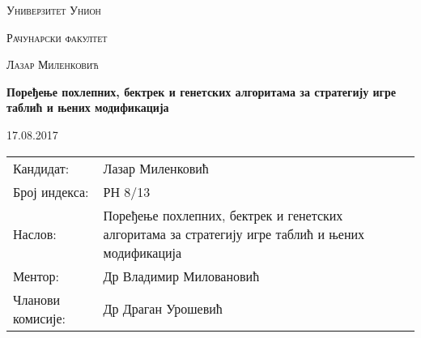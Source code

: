 \documentclass[a4paper, 12pt, ngerman]{article}
\newcommand{\DocumentTitle}{Поређење похлепних, бектрек и генетских алгоритама за стратегију игре таблић и њених модификација}
\begin{document}
\renewcommand{\contentsname}{Садржај}
\renewcommand{\refname}{Литература}
\renewcommand{\abstractname}{Апстракт}
\renewcommand{\figurename}{Слика}
\renewcommand{\appendixtocname}{Додаци}
\renewcommand{\lstlistingname}{Датотека}
\renewcommand{\tablename}{Табела}
\renewcommand{\proofname}{Доказ}

\makeatletter
\renewcommand{\ALG@name}{Алгоритам}
\makeatother

\begin{titlepage}
	\centering
	{\scshape\Large Универзитет Унион \par}
	\vspace{1cm}
	{\scshape\LARGE Рачунарски факултет\par}
	\vspace{2cm}
	{\scshape\large Лазар Миленковић\par}
	\vspace{0.5cm}
	{\huge\bfseries \DocumentTitle \par}
	\vspace{2cm}
	\vfill

	
	{\large 17.08.2017\par}
\end{titlepage}
\pagebreak


\begin{tabularx}{\textwidth}{lX}
	Кандидат: & Лазар Миленковић  \\
	Број индекса: & РН 8/13 \\
	Наслов: & \DocumentTitle \\
	Ментор: & Др Владимир Миловановић\\
		Чланови комисије: & Др Драган Урошевић\\
\end{tabularx}
\pagebreak
\begin{abstract}
У овом раду пореде се временска, меморијска сложеност, као и ефикасност похлепне стратегије, неколико бектрек стратегија, као и генетског алгоритма за играње таблића и њених модификација. Таблић је популарна игра картама у којој сваки играч наизменично повлачи једну карту са циљем да на крају игре има највећи збир сакупљених карата. У стандардној верзији, играч зна само карте које му се тренутно налазе у руци као и све карте које су прошле до сада. За ову верзију игре имплементирана је похлепна стратегија по узору на стратегије које користе играчи. Модификована верзија игре подразумева знање играча о редоследу карата у шпилу и за њу су имплементирани бектрек и генетски алгоритми.
\end{abstract}
\end{document}

